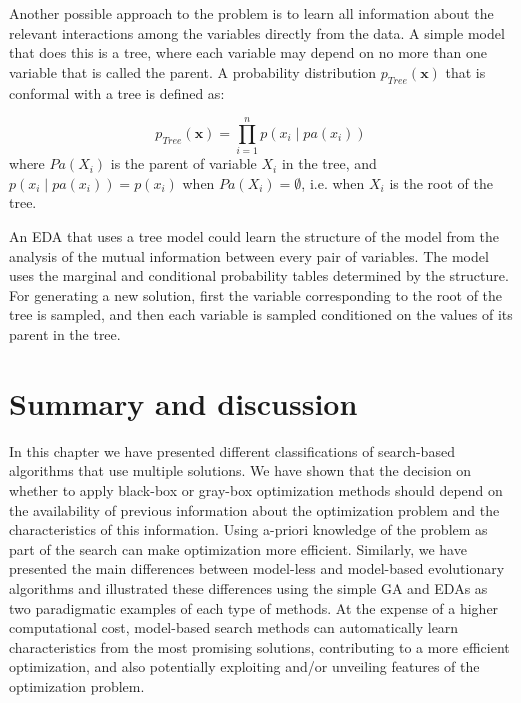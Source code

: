  Another possible approach to the problem is to learn all information about the relevant interactions among the variables directly from the data. A simple model that does this is a tree,  where each variable  may depend on no more than one variable that is called the parent. A probability distribution $p_{Tree}(\textbf{x})$ that is conformal with a tree is defined as:

\begin{equation}
   p_{Tree} (\textbf{x}) =\prod_{i=1}^{n} p(x_i \mid pa(x_i))  \label{eq:T-Tree}
\end{equation}
where $Pa(X_i)$  is the parent of variable $X_i$ in the tree, and $p(x_i \mid pa(x_i))=p(x_i)$ when $Pa(X_i)=\emptyset$, i.e. when $X_i$ is the root of the tree.

An EDA that uses a tree model \cite{Baluja_and_Davies:1997} could learn the structure of the model from the analysis of the mutual information between every pair of variables. The model uses the marginal and conditional probability tables determined by the structure. For generating a new solution, first the variable corresponding to the root of the tree is sampled, and then each variable is sampled conditioned on the values of its parent in the tree. 

 \section{Summary and discussion} \label{sec:Summary}


 In this chapter we have presented different classifications of search-based algorithms that use multiple solutions.  We have shown that the decision on whether to apply  black-box or gray-box optimization methods  should depend on the availability of previous information about the optimization problem and the characteristics of this information. Using a-priori knowledge of the problem as part of the search can make optimization more efficient. Similarly, we have presented the main differences between model-less and model-based evolutionary algorithms and illustrated these differences using the simple GA and EDAs as two paradigmatic examples of each type of methods. At the expense of a higher computational cost, model-based search methods can automatically learn characteristics from the most promising solutions, contributing to a more  efficient optimization, and also potentially exploiting and/or unveiling features of the optimization problem. 

 
 




